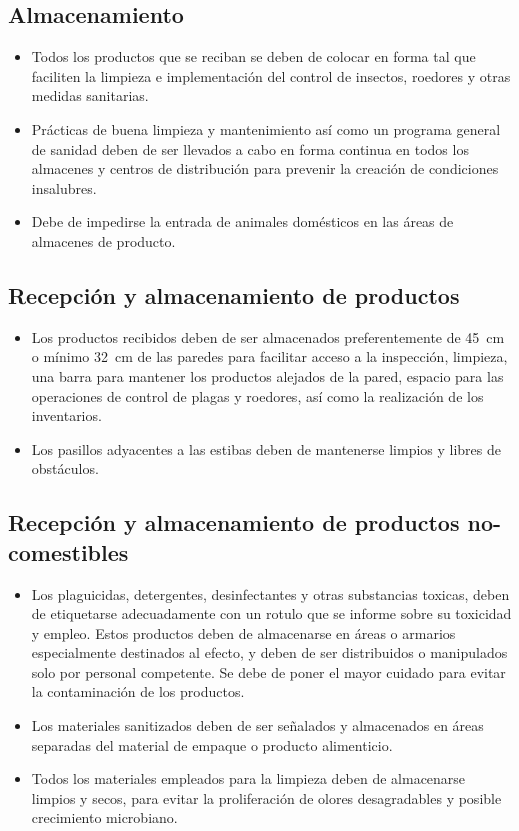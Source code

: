 \subsection{Almacenamiento}

\begin{itemize}
	\item Todos los productos que se reciban se deben de colocar en forma tal que faciliten la limpieza e implementación del control de insectos, roedores y otras medidas sanitarias.
	\item Prácticas de buena limpieza y mantenimiento así como un programa general de sanidad deben de ser llevados a cabo en forma continua en todos los almacenes y centros de distribución para prevenir la creación de condiciones insalubres.
	\item Debe de impedirse la entrada de animales domésticos en las áreas de almacenes de producto.
\end{itemize}

\subsection{Recepción y almacenamiento de productos}

\begin{itemize}
	\item Los productos recibidos deben de ser almacenados preferentemente de \SI{45}{\centi\meter} o mínimo \SI{32}{\centi\meter} de las paredes para facilitar acceso a la inspección, limpieza, una barra para mantener los productos alejados de la pared, espacio para las operaciones de control de plagas y roedores, así como la realización de los inventarios.
	\item Los pasillos adyacentes a las estibas deben de mantenerse limpios y libres de obstáculos.
\end{itemize}

\subsection{Recepción y almacenamiento de productos no-comestibles}

\begin{itemize}
	\item Los plaguicidas, detergentes, desinfectantes y otras substancias toxicas, deben de etiquetarse adecuadamente con un rotulo que se informe sobre su toxicidad y empleo. Estos productos deben de almacenarse en áreas o armarios especialmente destinados al efecto, y deben de ser distribuidos o manipulados solo por personal competente. Se debe de poner el mayor cuidado para evitar la contaminación de los productos.
	\item Los materiales sanitizados deben de ser señalados y almacenados en áreas separadas del material de empaque o producto alimenticio.
	\item Todos los materiales empleados para la limpieza deben de almacenarse limpios y secos, para evitar la proliferación de olores desagradables y posible crecimiento microbiano.
\end{itemize}

